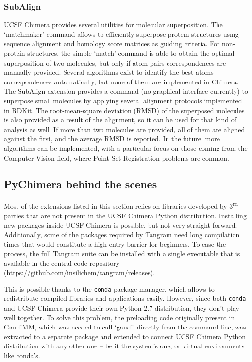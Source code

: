 \subsubsection{SubAlign}
UCSF Chimera provides several utilities for molecular superposition. The ‘matchmaker’ command allows to efficiently superpose protein structures using sequence alignment and homology score matrices as guiding criteria. For non-protein structures, the simple ‘match’ command is able to obtain the optimal superposition of two molecules, but only if atom pairs correspondences are manually provided. Several algorithms exist to identify the best atoms correspondences automatically,\cite{cho2006flame,girones2001tgsa} but none of them are implemented in Chimera. The SubAlign extension provides a command (no graphical interface currently) to superpose small molecules by applying several alignment protocols implemented in RDKit.\cite{rdkit} The root-mean-square deviation (RMSD) of the superposed molecules is also provided as a result of the alignment, so it can be used for that kind of analysis as well. If more than two molecules are provided, all of them are aligned against the first, and the average RMSD is reported. In the future, more algorithms can be implemented, with a particular focus on those coming from the Computer Vision field, where Point Set Registration problems are common.

\subsection{PyChimera behind the scenes}


Most of the extensions listed in this section relies on libraries developed by 3\textsuperscript{rd} parties that are not present in the UCSF Chimera Python distribution. Installing new packages inside UCSF Chimera is possible, but not very straight-forward. Additionally, some of the packages required by Tangram need long compilation times that would constitute a high entry barrier for beginners. To ease the process, the full Tangram suite can be installed with a single executable that is available in the central code repository (\href{https://github.com/insilichem/tangram/releases}{https://github.com/insilichem/tangram/releases}).

This is possible thanks to the \texttt{conda} package manager,\cite{conda} which allows to redistribute compiled libraries and applications easily. However, since both \texttt{conda} and UCSF Chimera provide their own Python 2.7 distribution, they don’t play well together. To solve this problem, the preloading code originally present in GaudiMM, which was needed to call ‘gaudi’ directly from the command-line, was extracted to a separate package and extended to connect UCSF Chimera Python distribution with any other one – be it the system’s one, or virtual environments like conda’s.

